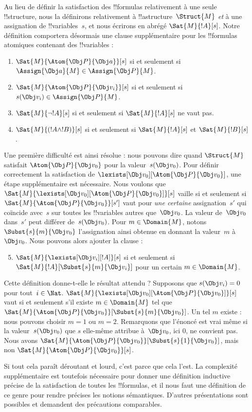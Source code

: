 \documentclass[../../../include/open-logic-section]{subfiles}
\begin{document}
Au lieu de définir la satisfaction des !!{formula}s relativement à une
seule !!{structure}, nous la définirons relativement à
!!a{structure}~$\Struct{M}$ \emph{et} à une assignation de
!!{variable}s~$s$, et nous écrirons en abrégé $\Sat{M}{!A}[s]$. Notre
définition comportera désormais une clause supplémentaire pour les
!!{formula}s atomiques contenant des !!{variable}s :
\begin{enumerate}
  \item $\Sat{M}{\Atom{\Obj P}{\Obj a}}[s]$ si et seulement si
  $\Assign{\Obj a}{M} \in \Assign{\Obj P}{M}$.
  \item $\Sat{M}{\Atom{\Obj P}{\Obj v_i}}[s]$ si et seulement si
  $s(\Obj v_i) \in \Assign{\Obj P}{M}$.
  \item $\Sat{M}{\lnot !A}[s]$ si et seulement si
  $\Sat{M}{!A}[s]$ ne vaut pas.
  \item $\Sat{M}{(!A \land !B)}[s]$ si et seulement si
  $\Sat{M}{!A}[s]$ et $\Sat{M}{!B}[s]$.
\end{enumerate}
Une première difficulté est ainsi résolue : nous pouvons dire quand
$\Struct{M}$ satisfait $\Atom{\Obj P}{\Obj v_0}$ pour la
valeur~$s(\Obj v_0)$. Pour définir correctement la satisfaction de
$\lexists[\Obj v_0][\Atom{\Obj P}{\Obj v_0}]$, une étape supplémentaire
est nécessaire. Nous voulons que
$\Sat{M}{\lexists[\Obj v_0][\Atom{\Obj P}{\Obj v_0}]}[s]$ vaille si et
seulement si
$\Sat{M}{\Atom{\Obj P}{\Obj v_0}}[s']$ vaut pour \emph{une certaine}
assignation~$s'$ qui coïncide avec~$s$ sur toutes les !!{variable}s
autres que~$\Obj v_0$. La valeur de~$\Obj v_0$ dans~$s'$ peut
différer de~$s(\Obj v_0)$. Pour $m \in \Domain{M}$, notons
$\Subst{s}{m}{\Obj v_0}$ l'assignation ainsi obtenue en donnant la
valeur~$m$ à~$\Obj v_0$. Nous pouvons alors ajouter la clause :
\begin{enumerate}\setcounter{enumi}{4}
  \item $\Sat{M}{\lexists[\Obj v_i][!A]}[s]$ si et seulement si
  $\Sat{M}{!A}[\Subst{s}{m}{\Obj v_i}]$ pour un certain
  $m \in \Domain{M}$.
\end{enumerate}
Cette définition donne-t-elle le résultat attendu ? Supposons que
$s(\Obj v_i) = 0$ pour tout~$i \in \Nat$.
$\Sat{M}{\lexists[\Obj v_0][\Atom{\Obj P}{\Obj v_0}]}[s]$ vaut si et
seulement s'il existe $m \in \Domain{M}$ tel que
$\Sat{M}{\Atom{\Obj P}{\Obj v_0}}[\Subst{s}{m}{\Obj v_0}]$.
Un tel $m$ existe : nous pouvons choisir $m = 1$ ou $m = 2$. Remarquons
que l'énoncé est vrai même si la valeur~$s(\Obj v_0)$ que $s$
elle-même attribue à~$\Obj v_0$, ici $0$, ne convient pas. Nous avons
$\Sat{M}{\Atom{\Obj P}{\Obj v_0}}[\Subst{s}{1}{\Obj v_0}]$, mais non
$\Sat{M}{\Atom{\Obj P}{\Obj v_0}}[s]$.

Si tout cela paraît déroutant et lourd, c'est parce que cela l'est. La
complexité supplémentaire est toutefois nécessaire pour donner une
définition inductive précise de la satisfaction de toutes les
!!{formula}s, et il nous faut une définition de ce genre pour rendre
précises les notions sémantiques. D'autres présentations sont possibles
et demandent des précautions comparables.
\end{document}
